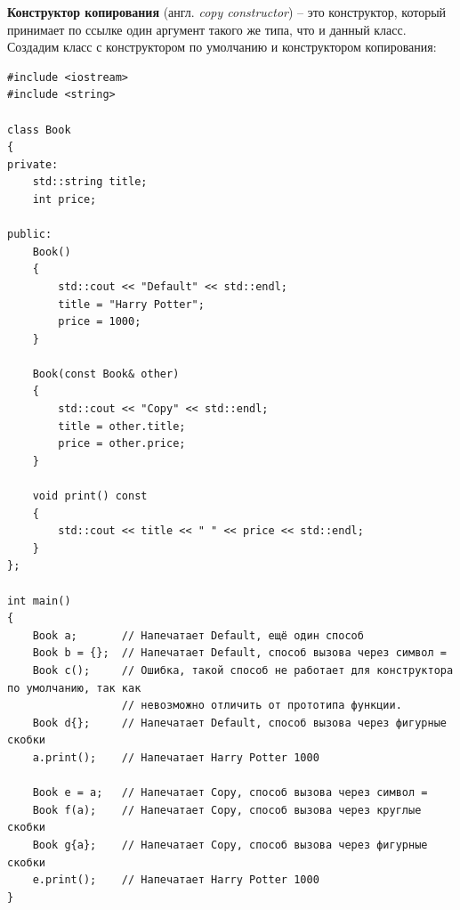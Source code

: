 \documentclass{article}
\begin{document}
\noindent \textbf{Конструктор копирования} (англ. \textit{copy constructor}) -- это конструктор, который принимает по ссылке один аргумент такого же типа, что и данный класс.\\

\noindent Создадим класс с конструктором по умолчанию и конструктором копирования:
\begin{lstlisting}
#include <iostream>
#include <string>

class Book 
{
private:
    std::string title;
    int price;
    
public:
	Book()
	{
		std::cout << "Default" << std::endl;
		title = "Harry Potter";
		price = 1000;
	}
	
	Book(const Book& other)
	{
		std::cout << "Copy" << std::endl;
		title = other.title;
		price = other.price;
	}

    void print() const
    {
        std::cout << title << " " << price << std::endl;
    }
};

int main() 
{
	Book a;       // Напечатает Default, ещё один способ
	Book b = {};  // Напечатает Default, способ вызова через символ =
	Book c();     // Ошибка, такой способ не работает для конструктора по умолчанию, так как
				  // невозможно отличить от прототипа функции.
	Book d{};     // Напечатает Default, способ вызова через фигурные скобки
	a.print();    // Напечатает Harry Potter 1000
	
	Book e = a;   // Напечатает Copy, способ вызова через символ =
	Book f(a);    // Напечатает Copy, способ вызова через круглые скобки
	Book g{a};    // Напечатает Copy, способ вызова через фигурные скобки
	e.print();    // Напечатает Harry Potter 1000
}
\end{lstlisting}
\end{document}
